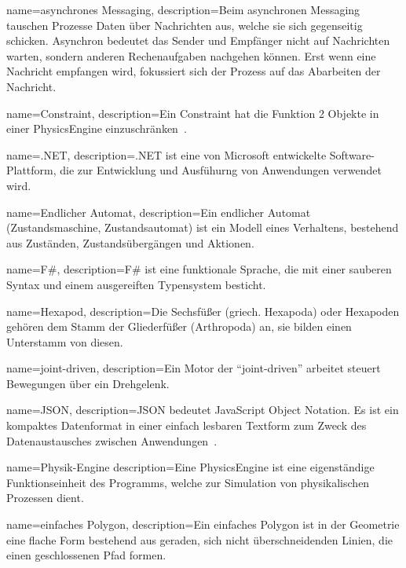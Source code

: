 %
%


%
%

%
%
{
  name={asynchrones Messaging},
  description={Beim asynchronen Messaging tauschen Prozesse Daten über Nachrichten aus,
    welche sie sich gegenseitig schicken.
    Asynchron bedeutet das Sender und Empfänger nicht auf Nachrichten warten,
    sondern anderen Rechenaufgaben nachgehen können.
    Erst wenn eine Nachricht empfangen wird, fokussiert sich der Prozess auf das Abarbeiten der Nachricht.}
}

{
  name={Constraint},
  description={Ein Constraint hat die Funktion 2 Objekte in einer \gls{PhysicsEngine} einzuschränken~\cite{gamedev:constraints}.}
}

{
  name={.NET},
  description={.NET ist eine von Microsoft entwickelte Software-Plattform,
    die zur Entwicklung und Ausfühurng von Anwendungen verwendet wird.}
}

{
  name={Endlicher Automat},
  description={Ein endlicher Automat (Zustandsmaschine, Zustandsautomat) ist ein Modell eines Verhaltens,
    bestehend aus Zuständen, Zustandsübergängen und Aktionen.}
}

{
  name={F\#},
  description={F\# ist eine funktionale Sprache,
    die mit einer sauberen Syntax und einem ausgereiften Typensystem besticht.}
}

{
  name={Hexapod},
  description={Die Sechsfüßer (griech. Hexapoda) oder Hexapoden
    gehören dem Stamm der Gliederfüßer (Arthropoda) an,
    sie bilden einen Unterstamm von diesen.}
}

{
  name={joint-driven},
  description={Ein Motor der ``joint-driven'' arbeitet steuert Bewegungen über ein Drehgelenk.}
}

{
  name={JSON},
  description={JSON bedeutet JavaScript Object Notation.
    Es ist ein kompaktes Datenformat in einer einfach lesbaren Textform
    zum Zweck des Datenaustausches zwischen Anwendungen~\cite{json}.}
}

{
  name={Physik-Engine}
  description={Eine \gls{PhysicsEngine} ist eine eigenständige Funktionseinheit des Programms,
    welche zur Simulation von physikalischen Prozessen dient.}
}

{
  name={einfaches Polygon},
  description={Ein einfaches Polygon ist in der Geometrie eine flache Form bestehend aus geraden,
    sich nicht überschneidenden Linien, die einen geschlossenen Pfad formen.}
}
